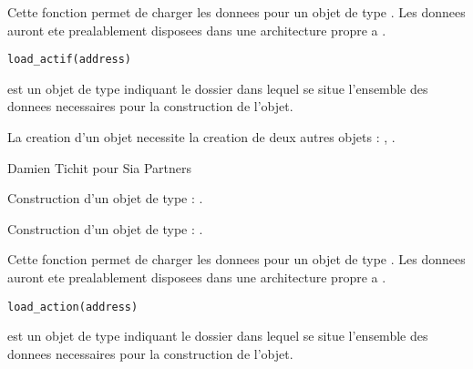 \documentclass[a4paper]{book}
\begin{document}
%
\begin{Description}\relax
Cette fonction permet de charger les donnees pour un objet de type . Les donnees auront ete prealablement disposees dans
une architecture propre a .
\end{Description}
%
\begin{Usage}
\begin{verbatim}
load_actif(address)
\end{verbatim}
\end{Usage}
%
\begin{Arguments}
\begin{ldescription}
\item[\code{address}] est un objet de type  indiquant le dossier dans lequel se situe l'ensemble des donnees necessaires
pour la construction de l'objet.
\end{ldescription}
\end{Arguments}
%
\begin{Details}\relax
La creation d'un objet  necessite la creation de deux autres objets : , .
\end{Details}
%
\begin{Author}\relax
Damien Tichit pour Sia Partners
\end{Author}
%
\begin{SeeAlso}\relax
Construction d'un objet de type  : .

Construction d'un objet de type  : .
\end{SeeAlso}
%
\begin{Description}\relax
Cette fonction permet de charger les donnees pour un objet de type . Les donnees auront ete prealablement disposees dans
une architecture propre a .
\end{Description}
%
\begin{Usage}
\begin{verbatim}
load_action(address)
\end{verbatim}
\end{Usage}
%
\begin{Arguments}
\begin{ldescription}
\item[\code{address}] est un objet de type  indiquant le dossier dans lequel se situe l'ensemble des donnees necessaires
pour la construction de l'objet.
\end{ldescription}
\end{Arguments}
\end{document}
